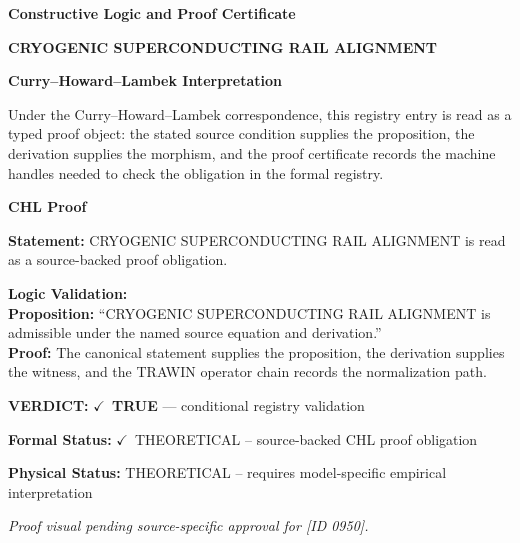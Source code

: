 \clearpage
\begingroup\tzpsupportsetup
\noindent\textbf{\fontsize{10.8pt}{12.8pt}\selectfont [ID 0950] Constructive Logic and Proof Certificate}\par
\noindent\textbf{\fontsize{10pt}{12pt}\selectfont CRYOGENIC SUPERCONDUCTING RAIL ALIGNMENT}\par
\vspace{0.45em}
\begingroup
\footnotesize
\setlength{\parskip}{0.22em}
\setlength{\parindent}{0pt}
\noindent\textbf{Curry--Howard--Lambek Interpretation}\par
Under the Curry--Howard--Lambek correspondence, this registry entry is read as a typed proof
object: the stated source condition supplies the proposition, the derivation supplies the
morphism, and the proof certificate records the machine handles needed to check the obligation
in the formal registry.

\vspace{0.45em}
\noindent\textbf{CHL Proof}\par
\textbf{Statement:} CRYOGENIC SUPERCONDUCTING RAIL ALIGNMENT is read as a source-backed proof obligation.

\textbf{Logic Validation:}\\
\textbf{Proposition:} ``CRYOGENIC SUPERCONDUCTING RAIL ALIGNMENT is admissible under the named source equation and derivation.''\\
\textbf{Proof:} The canonical statement supplies the proposition, the derivation supplies the witness, and the TRAWIN operator chain records the normalization path.

\textbf{VERDICT:} \ensuremath{\checkmark}\ \textbf{TRUE} --- conditional registry validation

\textbf{Formal Status:} \ensuremath{\checkmark}\ THEORETICAL -- source-backed CHL proof obligation

\textbf{Physical Status:} THEORETICAL -- requires model-specific empirical interpretation
\par\vspace{0.45em}
\par
\vfill
\begingroup\footnotesize\itshape
Proof visual pending source-specific approval for [ID 0950].
\par\endgroup
\vfill
\endgroup
\endgroup
